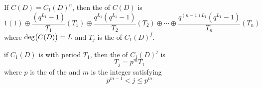 \begin{theorem}\label{thm:Cycle_Set_Multiple_of_Connection_Polynomial}
  If $C(D) = {C_{1}(D)}^{n}$, then the  of $C(D)$ is
  \begin{equation}\label{eq:Cycle_Set_Multiple_of_Connection_Polynomial}
    1(1) \oplus \frac{\left( q^{L_{1}}-1 \right)}{T_{1}} \left( T_{1} \right) \oplus \frac{q^{L_{1}} \left( q^{L_{1}}-1 \right)}{T_{2}} \left( T_{2} \right) \oplus \cdots \oplus \frac{q^{(n-1)L_{1}}\left( q^{L_{1}}-1 \right)}{T_{n}} \left( T_{n} \right)
  \end{equation}
  where $\operatorname{\operatorname{deg}} \bigl( C(D) \bigr) = L$ and $T_{j}$ is the  of ${C_{1}(D)}^{j}$.
\end{theorem}

\begin{theorem}\label{thm:Irreducible_Connection_Polynomial_Multiple_Cycle_Set}
  if $C_{1}(D)$ is  with period $T_{1}$, then the  of ${C_{1}(D)}^{j}$ is
  \begin{equation}\label{eq:Irreducible_Connection_Polynomial_Multiple_Cycle_Set}
    T_{j} = p^{m}T_{1}
  \end{equation}
  where $p$ is the  of the  and $m$ is the integer satisfying
  \begin{equation}\label{eq:Irreducible_Connection_Polynomial_Multiple_Cycle_Set_Requirement}
    p^{m-1} < j \leq p^{m}
  \end{equation}
\end{theorem}

